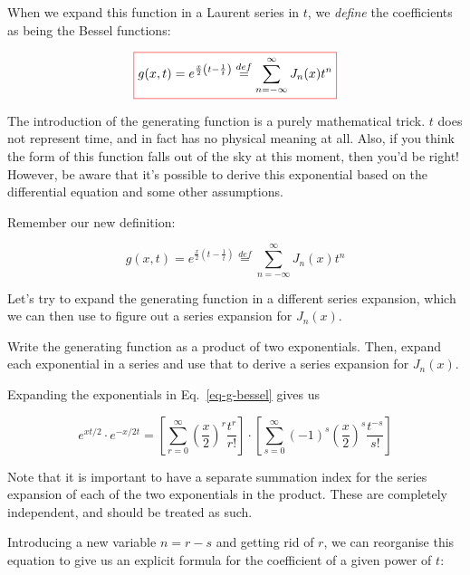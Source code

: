 When we expand this function in a Laurent series in $t$, we \emph{define} the coefficients as being the Bessel functions:

\begin{equation}
\fbox{$\displaystyle
 g(x,t) = e^{\frac{x}{2}\left(t-\frac{1}{t}\right)} \stackrel{def}{=} \sum_{n = - \infty}^{\infty} J_n(x)t^n
    $}
  \label{eq-g-bessel}
\end{equation}

The introduction of the generating function is a purely mathematical trick. $t$ does not represent time, and in fact has no physical meaning at all. Also, if you think the form of this function falls out of the sky at this moment, then you'd be right! However, be aware that it's possible to derive this exponential based on the differential equation and some other assumptions.


\pagebreak


Remember our new definition: 

$$g(x,t) =  e^{\frac{x}{2}\left(t-\frac{1}{t}\right)} \stackrel{def}{=} \sum_{n = - \infty}^{\infty} J_n(x)t^n$$

Let's try to expand the generating function in a different series expansion, which we can then use to figure out a series expansion for $J_n(x)$.

\begin{cue}
Write the generating function as a product of two exponentials. Then, expand each exponential in a series and use that to derive a series expansion for $J_n(x)$.  
\end{cue}

Expanding the exponentials in Eq.~\ref{eq-g-bessel} gives us

\begin{equation}
e^{xt/2} \cdot e^{-x/2t} = \left[ \sum_{r = 0}^{\infty} {\left(\frac{x}{2}\right)}^r \frac{t^r}{r!} \right] \cdot \left [\sum_{s = 0}^{\infty} {(-1)}^s { \left(\frac{x}{2}\right)}^s \frac{t^{-s}}{s!} \right]
\end{equation} 

Note that it is important to have a separate summation index for the series expansion of each of the two exponentials in the product. These are completely independent, and should be treated as such.

\noindent{}Introducing a new variable $n = r - s$ and getting rid of $r$, we can reorganise this equation to give us an explicit formula for the coefficient of a given power of $t$:

